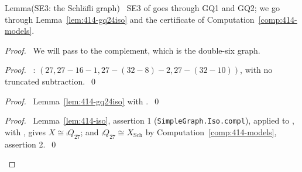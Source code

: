 \begin{namedresult}{Lemma}{(SE3: the Schl\"afli graph)}\label{lem:414-SE3}
 \new\ SE3 of  goes through GQ1 and GQ2; we go through
 Lemma~\ref{lem:414-gq24iso} and the certificate of Computation~\ref{comp:414-models}.
\end{namedresult}
\begin{proof}
 \pfsketch\ We will pass to the complement, which is the double-six graph.
 \begin{proof}\pf\ : $(27,27-16-1,27-(32-8)-2,27-(32-10))$, with no
  truncated subtraction.~\qed\end{proof}
 \begin{proof}\pf\ Lemma~\ref{lem:414-gq24iso} with .~\qed\end{proof}
 \qedstep
 \begin{proof}\pf\ Lemma~\ref{lem:414-iso}, assertion 1 (\texttt{SimpleGraph.Iso.compl}), applied
  to , with , gives $X\cong\comp{Q_{27}}$; and
  $\comp{Q_{27}}\cong X_{\mathrm{Sch}}$ by Computation~\ref{comp:414-models},
  assertion 2.~\qed\end{proof}
\end{proof}

